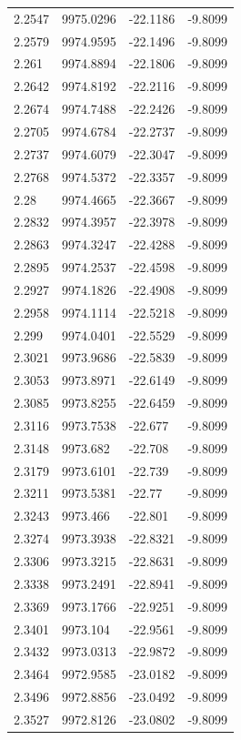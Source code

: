 \begin{table}[H]
\begin{tabular}{llll}
2.2547 & 9975.0296 & -22.1186 & -9.8099 \\
2.2579 & 9974.9595 & -22.1496 & -9.8099 \\
2.261 & 9974.8894 & -22.1806 & -9.8099 \\
2.2642 & 9974.8192 & -22.2116 & -9.8099 \\
2.2674 & 9974.7488 & -22.2426 & -9.8099 \\
2.2705 & 9974.6784 & -22.2737 & -9.8099 \\
2.2737 & 9974.6079 & -22.3047 & -9.8099 \\
2.2768 & 9974.5372 & -22.3357 & -9.8099 \\
2.28 & 9974.4665 & -22.3667 & -9.8099 \\
2.2832 & 9974.3957 & -22.3978 & -9.8099 \\
2.2863 & 9974.3247 & -22.4288 & -9.8099 \\
2.2895 & 9974.2537 & -22.4598 & -9.8099 \\
2.2927 & 9974.1826 & -22.4908 & -9.8099 \\
2.2958 & 9974.1114 & -22.5218 & -9.8099 \\
2.299 & 9974.0401 & -22.5529 & -9.8099 \\
2.3021 & 9973.9686 & -22.5839 & -9.8099 \\
2.3053 & 9973.8971 & -22.6149 & -9.8099 \\
2.3085 & 9973.8255 & -22.6459 & -9.8099 \\
2.3116 & 9973.7538 & -22.677 & -9.8099 \\
2.3148 & 9973.682 & -22.708 & -9.8099 \\
2.3179 & 9973.6101 & -22.739 & -9.8099 \\
2.3211 & 9973.5381 & -22.77 & -9.8099 \\
2.3243 & 9973.466 & -22.801 & -9.8099 \\
2.3274 & 9973.3938 & -22.8321 & -9.8099 \\
2.3306 & 9973.3215 & -22.8631 & -9.8099 \\
2.3338 & 9973.2491 & -22.8941 & -9.8099 \\
2.3369 & 9973.1766 & -22.9251 & -9.8099 \\
2.3401 & 9973.104 & -22.9561 & -9.8099 \\
2.3432 & 9973.0313 & -22.9872 & -9.8099 \\
2.3464 & 9972.9585 & -23.0182 & -9.8099 \\
2.3496 & 9972.8856 & -23.0492 & -9.8099 \\
2.3527 & 9972.8126 & -23.0802 & -9.8099 \\

\end{tabular}
\end{table}
